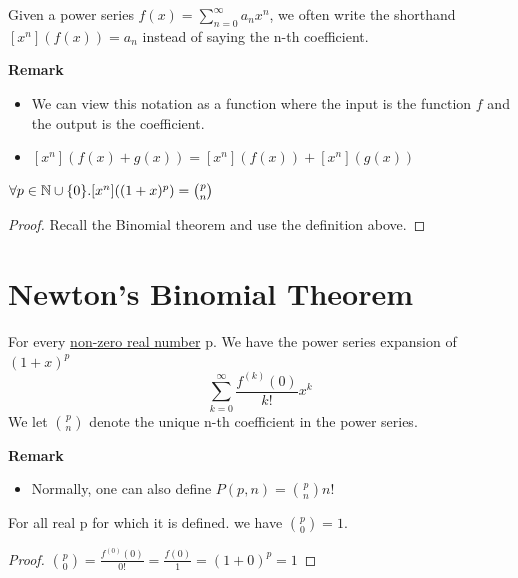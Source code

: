\begin{definition}
    Given a power series $f(x)=\sum_{n=0}^{\infty}a_nx^n$, 
    we often write the shorthand $[x^n](f(x))=a_n$ instead of saying the n-th coefficient.
\end{definition}
\textbf{Remark}
\begin{itemize}
    \item We can view this notation as a function where the input is the function $f$ and the output is the coefficient.
    \item $[x^n](f(x)+g(x))=[x^n](f(x))+[x^n](g(x))$
\end{itemize}

\begin{theorem}
    $\forall p \in \mathbb{N} \cup\{0\}. [x^n]((1+x)^p)={p \choose n}$
\end{theorem}
\begin{proof}
    Recall the Binomial theorem and use the definition above.
\end{proof}

\section{Newton's Binomial Theorem}

\begin{theorem}
    For every \underline{non-zero real number} p. 
    We have the power series expansion of $(1+x)^p$
    $$\sum_{k=0}^{\infty}\frac{f^{(k)}(0)}{k!}x^k$$
    We let ${p \choose n}$ denote the unique n-th coefficient in the power series.
\end{theorem}
\textbf{Remark}
\begin{itemize}
    \item Normally, one can also define $P(p,n)={p \choose n}n!$
\end{itemize}

\begin{lemma}
    For all real p for which it is defined. we have ${p \choose 0}=1$.
\end{lemma}
\begin{proof}
    ${p \choose 0}=\frac{f^{(0)}(0)}{0!}=\frac{f(0)}{1}=(1+0)^p=1$
\end{proof}

